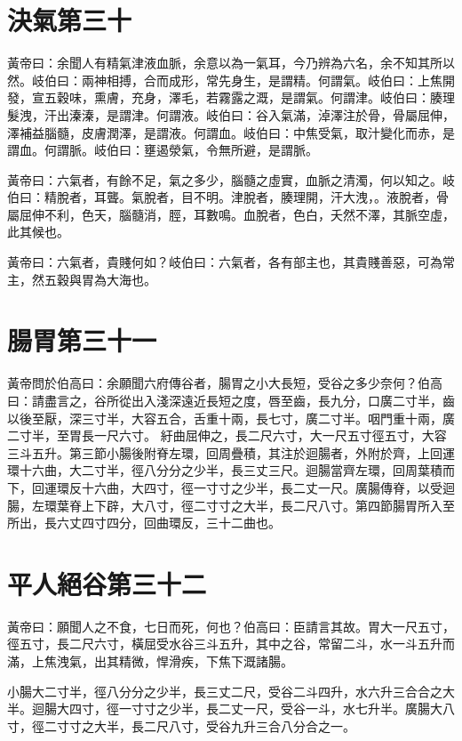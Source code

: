 \section{決氣第三十}

黃帝曰：余聞人有精氣津液血脈，余意以為一氣耳，今乃辨為六名，余不知其所以然。岐伯曰：兩神相搏，合而成形，常先身生，是謂精。何謂氣。岐伯曰：上焦開發，宣五穀味，熏膚，充身，澤毛，若霧露之溉，是謂氣。何謂津。岐伯曰：腠理髮洩，汗出溱溱，是謂津。何謂液。岐伯曰：谷入氣滿，淖澤注於骨，骨屬屈伸，澤補益腦髓，皮膚潤澤，是謂液。何謂血。岐伯曰：中焦受氣，取汁變化而赤，是謂血。何謂脈。岐伯曰：壅遏滎氣，令無所避，是謂脈。

黃帝曰：六氣者，有餘不足，氣之多少，腦髓之虛實，血脈之清濁，何以知之。岐伯曰：精脫者，耳聾。氣脫者，目不明。津脫者，腠理開，汗大洩，。液脫者，骨屬屈伸不利，色天，腦髓消，脛，耳數鳴。血脫者，色白，夭然不澤，其脈空虛，此其候也。

黃帝曰：六氣者，貴賤何如？岐伯曰：六氣者，各有部主也，其貴賤善惡，可為常主，然五穀與胃為大海也。


\section{腸胃第三十一}

黃帝問於伯高曰：余願聞六府傳谷者，腸胃之小大長短，受谷之多少奈何？伯高曰：請盡言之，谷所從出入淺深遠近長短之度，唇至齒，長九分，口廣二寸半，齒以後至厭，深三寸半，大容五合，舌重十兩，長七寸，廣二寸半。咽門重十兩，廣二寸半，至胃長一尺六寸。
紆曲屈伸之，長二尺六寸，大一尺五寸徑五寸，大容三斗五升。第三節小腸後附脊左環，回周疊積，其注於迴腸者，外附於齊，上回運環十六曲，大二寸半，徑八分分之少半，長三丈三尺。迴腸當齊左環，回周葉積而下，回運環反十六曲，大四寸，徑一寸寸之少半，長二丈一尺。廣腸傳脊，以受迴腸，左環葉脊上下辟，大八寸，徑二寸寸之大半，長二尺八寸。第四節腸胃所入至所出，長六丈四寸四分，回曲環反，三十二曲也。



\section{平人絕谷第三十二}

黃帝曰：願聞人之不食，七日而死，何也？伯高曰：臣請言其故。胃大一尺五寸，徑五寸，長二尺六寸，橫屈受水谷三斗五升，其中之谷，常留二斗，水一斗五升而滿，上焦洩氣，出其精微，悍滑疾，下焦下溉諸腸。

小腸大二寸半，徑八分分之少半，長三丈二尺，受谷二斗四升，水六升三合合之大半。迴腸大四寸，徑一寸寸之少半，長二丈一尺，受谷一斗，水七升半。廣腸大八寸，徑二寸寸之大半，長二尺八寸，受谷九升三合八分合之一。

